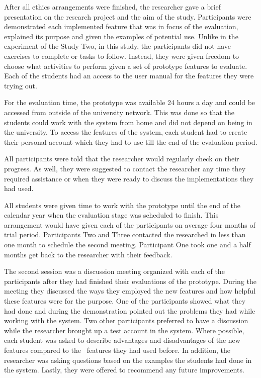 After all ethics arrangements were finished, the researcher gave a brief
presentation on the research project and the aim of the study. Participants were
demonstrated each implemented feature that was in focus of the evaluation,
explained its purpose and given the examples of potential use. Unlike in the
experiment of the Study Two, in this study, the participants did not have
exercises to complete or tasks to follow. Instead, they were given freedom to
choose what activities to perform given a set of prototype features to evaluate.
Each of the students had an access to the user manual for the features they were
trying out. 

For the evaluation time, the prototype was available 24 hours a day and could be
accessed from outside of the university network. This was done so that the
students could work with the system from home and did not depend on being in the
university. To access the features of the system, each student had to create
their personal account which they had to use till the end of the evaluation
period.

All participants were told that the researcher would regularly check on their
progress. As well, they were suggested to contact the researcher any time they
required assistance or when they were ready to discuss the implementations they
had used.

All students were given time to work with the prototype until the end of the
calendar year when the evaluation stage was scheduled to finish. This
arrangement would have given each of the participants on average four months of
trial period. Participants Two and Three contacted the researched in less than
one month to schedule the second meeting. Participant One took one and a half
months get back to the researcher with their feedback.

The second session was a discussion meeting organized with each of the
participants after they had finished their evaluations of the prototype. During
the meeting they discussed the ways they employed the new features and how
helpful these features were for the purpose. One of the participants showed
what they had done and during the demonstration pointed out the problems they
had while working with the system. Two other participants preferred to have a
discussion while the researcher brought up a test account in the system. Where
possible, each student was asked to describe advantages and disadvantages of the
new features compared to the \ep~features they had used before. In addition, the
researcher was asking questions based on the examples the students had done in
the system. Lastly, they were offered to recommend any future improvements.

